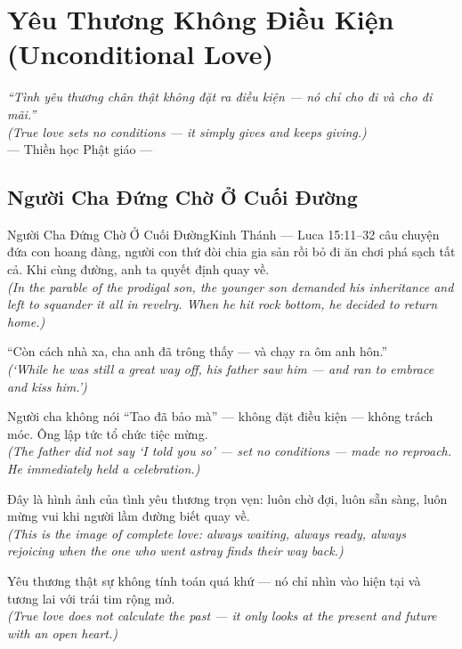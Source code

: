 \chapter{Yêu Thương Không Điều Kiện (Unconditional Love)}
\begin{center}
  \textit{\color{truyengold}``Tình yêu thương chân thật không đặt ra điều kiện --- nó chỉ cho đi và cho đi mãi.''}\\[4pt]
  \textit{(True love sets no conditions --- it simply gives and keeps giving.)}\\[4pt]
  \small\color{truyenblue}--- Thiền học Phật giáo ---
\end{center}
\ngancach

\section{Người Cha Đứng Chờ Ở Cuối Đường}
\begin{truyen}{Người Cha Đứng Chờ Ở Cuối Đường}{Kinh Thánh --- Luca 15:11--32}
 câu chuyện đứa con hoang đàng, người con thứ đòi chia gia sản rồi bỏ đi ăn chơi phá sạch tất cả. Khi cùng đường, anh ta quyết định quay về.\\[4pt]
\textit{(In the parable of the prodigal son, the younger son demanded his inheritance and left to squander it all in revelry. When he hit rock bottom, he decided to return home.)}

``Còn cách nhà xa, cha anh đã trông thấy --- và chạy ra ôm anh hôn.''\\[4pt]
\textit{(`While he was still a great way off, his father saw him --- and ran to embrace and kiss him.')}

Người cha không nói ``Tao đã bảo mà'' --- không đặt điều kiện --- không trách móc. Ông lập tức tổ chức tiệc mừng.\\[4pt]
\textit{(The father did not say `I told you so' --- set no conditions --- made no reproach. He immediately held a celebration.)}

Đây là hình ảnh của tình yêu thương trọn vẹn: luôn chờ đợi, luôn sẵn sàng, luôn mừng vui khi người lầm đường biết quay về.\\[4pt]
\textit{(This is the image of complete love: always waiting, always ready, always rejoicing when the one who went astray finds their way back.)}

\end{truyen}
\begin{baihoc}
  Yêu thương thật sự không tính toán quá khứ --- nó chỉ nhìn vào hiện tại và tương lai với trái tim rộng mở.\\[4pt]
  \textit{(True love does not calculate the past --- it only looks at the present and future with an open heart.)}
\end{baihoc}

